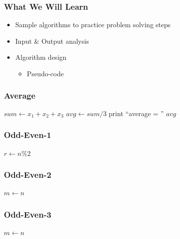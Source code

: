 \documentclass{../c-lecture}
\subtitle{Algorithm Design}
\begin{document}
\begin{frame}
  \titlepage{}
\end{frame}

\begin{frame}
  \frametitle{What We Will Learn}
  \begin{itemize}
    \item Sample algorithms to practice problem solving steps
    \item Input \& Output analysis
    \item Algorithm design
    \begin{itemize}
      \item Pseudo-code
    \end{itemize}
  \end{itemize}
\end{frame}

\begin{frame}
  \frametitle{Average}
  \begin{algorithm}[H]
  $sum \gets x_1 + x_2 + x_3$\;
  $avg \gets sum / 3$\;
  print ``average = '' $avg$ \;
  \end{algorithm}
\end{frame}

\begin{frame}
  \frametitle{Odd-Even-1}
  \begin{algorithm}[H]
  $r \gets n \% 2$\;
  \end{algorithm}
\end{frame}

\begin{frame}
  \frametitle{Odd-Even-2}
  \begin{algorithm}[H]
  $m \gets n$\;
  \end{algorithm}
\end{frame}

\begin{frame}
  \frametitle{Odd-Even-3}
  \begin{algorithm}[H]
  $m \gets n$\;
  \end{algorithm}
\end{frame}
\end{document}
